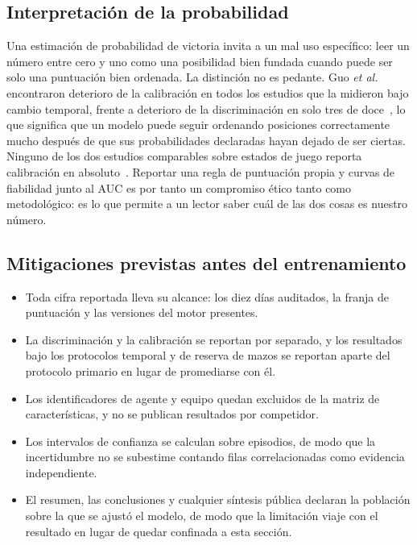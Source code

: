 \documentclass[conference]{IEEEtran}
\begin{document}
\subsection{Interpretaci\'on de la probabilidad}
Una estimaci\'on de probabilidad de victoria invita a un mal uso
espec\'ifico: leer un n\'umero entre cero y uno como una posibilidad bien
fundada cuando puede ser solo una puntuaci\'on bien ordenada. La distinci\'on
no es pedante. Guo \textit{et al.} encontraron deterioro de la calibraci\'on
en todos los estudios que la midieron bajo cambio temporal, frente a
deterioro de la discriminaci\'on en solo tres de
doce~\cite{guo_temporalshift_2021}, lo que significa que un modelo puede
seguir ordenando posiciones correctamente mucho despu\'es de que sus
probabilidades declaradas hayan dejado de ser ciertas. Ninguno de los dos
estudios comparables sobre estados de juego reporta calibraci\'on en
absoluto~\cite{janusz_hearthstone_2017,bialecki_sc2egset_2023}. Reportar una
regla de puntuaci\'on propia y curvas de fiabilidad junto al AUC es por
tanto un compromiso \'etico tanto como metodol\'ogico: es lo que permite a
un lector saber cu\'al de las dos cosas es nuestro n\'umero.

\subsection{Mitigaciones previstas antes del entrenamiento}
\begin{itemize}
  \item Toda cifra reportada lleva su alcance: los diez d\'ias auditados, la
        franja de puntuaci\'on y las versiones del motor presentes.
  \item La discriminaci\'on y la calibraci\'on se reportan por separado, y
        los resultados bajo los protocolos temporal y de reserva de mazos se
        reportan aparte del protocolo primario en lugar de promediarse con
        \'el.
  \item Los identificadores de agente y equipo quedan excluidos de la matriz
        de caracter\'isticas, y no se publican resultados por competidor.
  \item Los intervalos de confianza se calculan sobre episodios, de modo que
        la incertidumbre no se subestime contando filas correlacionadas como
        evidencia independiente.
  \item El resumen, las conclusiones y cualquier s\'intesis p\'ublica
        declaran la poblaci\'on sobre la que se ajust\'o el modelo, de modo
        que la limitaci\'on viaje con el resultado en lugar de quedar
        confinada a esta secci\'on.
\end{itemize}
\end{document}
